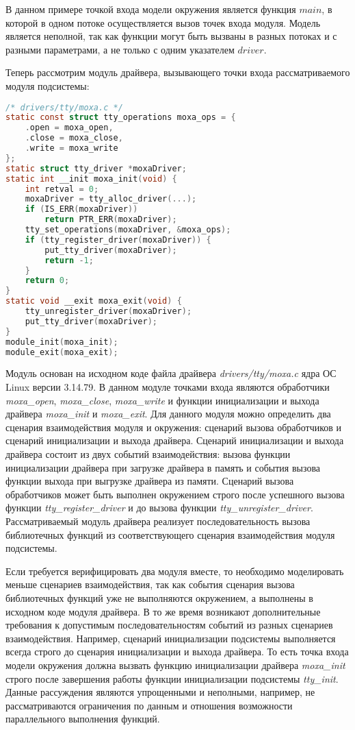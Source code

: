 В данном примере точкой входа модели окружения является функция $main$, в которой в одном потоке осуществляется вызов точек входа модуля.
Модель является неполной, так как функции могут быть вызваны в разных потоках и с разными параметрами, а не только с одним указателем $driver$.

Теперь рассмотрим модуль драйвера, вызывающего точки входа рассматриваемого модуля подсистемы:
\begin{lstlisting}[language=C,basicstyle=\small]
/* drivers/tty/moxa.c */
static const struct tty_operations moxa_ops = {
	.open = moxa_open,
	.close = moxa_close,
	.write = moxa_write
};
static struct tty_driver *moxaDriver;
static int __init moxa_init(void) {
	int retval = 0;
	moxaDriver = tty_alloc_driver(...);
	if (IS_ERR(moxaDriver))
		return PTR_ERR(moxaDriver);
    tty_set_operations(moxaDriver, &moxa_ops);
    if (tty_register_driver(moxaDriver)) {
		put_tty_driver(moxaDriver);
		return -1;
	}
	return 0;
}
static void __exit moxa_exit(void) {
    tty_unregister_driver(moxaDriver);
	put_tty_driver(moxaDriver);
}
module_init(moxa_init);
module_exit(moxa_exit);
\end{lstlisting}

Модуль основан на исходном коде файла драйвера \textit{drivers/tty/moxa.c} ядра ОС Linux версии 3.14.79.
В данном модуле точками входа являются обработчики \textit{moxa\_open}, \textit{moxa\_close}, \textit{moxa\_write} и функции инициализации и выхода драйвера \textit{moxa\_init} и \textit{moxa\_exit}.
Для данного модуля можно определить два сценария взаимодействия модуля и окружения: сценарий вызова обработчиков и сценарий инициализации и выхода драйвера.
Сценарий инициализации и выхода драйвера состоит из двух событий взаимодействия: вызова функции инициализации драйвера при загрузке драйвера в память и события вызова функции выхода при выгрузке драйвера из памяти.
Сценарий вызова обработчиков может быть выполнен окружением строго после успешного вызова функции \textit{tty\_register\_driver} и до вызова функции \textit{tty\_unregister\_driver}.
Рассматриваемый модуль драйвера реализует последовательность вызова библиотечных функций из соответствующего сценария взаимодействия модуля подсистемы.
 
Если требуется верифицировать два модуля вместе, то необходимо моделировать меньше сценариев взаимодействия, так как события сценария вызова библиотечных функций уже не выполняются окружением, а выполнены в исходном коде модуля драйвера.
В то же время возникают дополнительные требования к допустимым последовательностям событий из разных сценариев взаимодействия.
Например, сценарий инициализации подсистемы выполняется всегда строго до сценария инициализации и выхода драйвера. То есть точка входа модели окружения должна вызвать функцию инициализации драйвера \textit{moxa\_init} строго после завершения работы функции инициализации подсистемы \textit{tty\_init}.
Данные рассуждения являются упрощенными и неполными, например, не рассматриваются ограничения по данным и отношения возможности параллельного выполнения функций.

